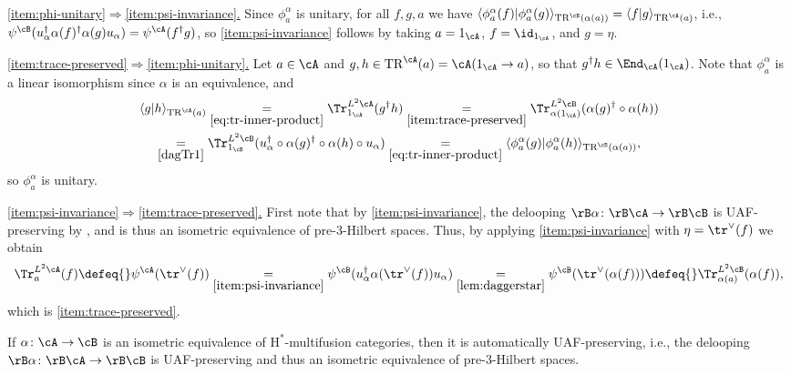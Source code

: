\documentclass[12pt,reqno]{amsart}
\newcounter{alpha}\renewcommand\thealpha{\upshape\Alph{alpha}}
\newcommand{\Hstar}{\ensuremath{\mathrm{H}^{*}}}
\newcommand{\itemstep}[1]{\smallskip\noindent\underline{#1}}
\begin{document}
\begin{pf}~

\itemstep{\ref{item:phi-unitary}$\Rightarrow$\ref{item:psi-invariance}.}
Since $\phi_a^\alpha$ is unitary, for all $f,g,a$ we have $\langle \phi_a^\alpha(f) |\phi_a^\alpha(g)\rangle_{\mathrm{TR}^{\cB}(\alpha(a))} = \langle f |g \rangle_{\mathrm{TR}^{\cA}(a)}$, i.e., $\psi^{\cB}(u_\alpha^\dag \alpha(f)^\dag \alpha(g) u_\alpha) = \psi^{\cA}(f^\dag g)$, so \ref{item:psi-invariance} follows by taking $a = 1_\cA$, $f = \id_{1_\cA}$, and $g = \eta$.

\itemstep{\ref{item:trace-preserved}$\Rightarrow$\ref{item:phi-unitary}.}
Let $a \in \cA$ and $g,h \in \mathrm{TR}^{\cA}(a) = \cA(1_\cA \to a)$, so that $g^\dag h \in \End_\cA(1_\cA)$. Note that $\phi_a^\alpha$ is a linear isomorphism since $\alpha$ is an equivalence, and
\begin{multline*}
\langle g |h \rangle_{\mathrm{TR}^{\cA}(a)} \underset{\eqref{eq:tr-inner-product}}{=} \Tr^{L^2\cA}_{1_\cA}(g^\dag h) \underset{\ref{item:trace-preserved}}{=} \Tr^{L^2\cB}_{\alpha(1_\cA)}(\alpha(g)^\dag \circ \alpha(h)) 
\\
\underset{\ref{dagTr1}}{=} \Tr^{L^2\cB}_{1_\cB}(u_\alpha^\dag \circ \alpha(g)^\dag \circ \alpha(h) \circ u_\alpha) \underset{\eqref{eq:tr-inner-product}}{=} \langle \phi_a^\alpha(g) |\phi_a^\alpha(h) \rangle_{\mathrm{TR}^{\cB}(\alpha(a))},
\end{multline*}
so $\phi_a^\alpha$ is unitary. 

\itemstep{\ref{item:psi-invariance}$\Rightarrow$\ref{item:trace-preserved}.}
First note that by \ref{item:psi-invariance}, the delooping $\rB\alpha\colon \rB\cA \to \rB\cB$ is UAF-preserving by \cite[Prop. 4.9]{3Hilb}, and is thus an isometric equivalence of pre-3-Hilbert spaces. Thus, by applying \ref{item:psi-invariance} with $\eta = \tr^{\vee}(f)$ we obtain
\[
\Tr_a^{L^2\cA}(f) \defeq{} \psi^{\cA}(\tr^\vee(f)) \underset{\ref{item:psi-invariance}}{=} \psi^{\cB}(u_\alpha^\dag \alpha(\tr^\vee(f)) u_\alpha) \underset{\eqref{lem:daggerstar}}{=} \psi^{\cB}(\tr^\vee(\alpha(f))) \defeq{} \Tr_{\alpha(a)}^{L^2\cB}(\alpha(f)),
\]
which is \ref{item:trace-preserved}. 
\end{pf}

\begin{corollary}
\label{cor:isometric-uaf}
If $\alpha\colon \cA \to \cB$ is an isometric equivalence of $\Hstar$-multifusion categories, then it is automatically UAF-preserving, i.e., the delooping $\rB\alpha\colon \rB\cA \to \rB\cB$ is UAF-preserving and thus an isometric equivalence of pre-3-Hilbert spaces.
\end{corollary}
\end{document}
